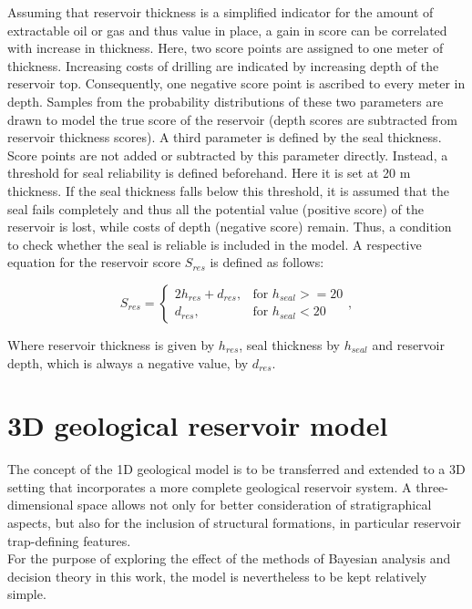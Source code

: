 	        Assuming that reservoir thickness is a simplified indicator for the amount of extractable oil or gas and thus value in place, a gain in score can be correlated with increase in thickness. Here, two score points are assigned to one meter of thickness. Increasing costs of drilling are indicated by increasing depth of the reservoir top. Consequently, one negative score point is ascribed to every meter in depth. Samples from the probability distributions of these two parameters are drawn to model the true score of the reservoir (depth scores are subtracted from reservoir thickness scores).
	        A third parameter is defined by the seal thickness. Score points are not added or subtracted by this parameter directly. Instead, a threshold for seal reliability is defined beforehand. Here it is set at 20 m thickness. If the seal thickness falls below this threshold, it is assumed that the seal fails completely and thus all the potential value (positive score) of the reservoir is lost, while costs of depth (negative score) remain. Thus, a condition to check whether the seal is reliable is included in the model. A respective equation for the reservoir score $S_{res}$ is defined as follows:
			
			\begin{equation}\label{eq:1D_score_system}
			S_{res} = 
			\begin{cases}
			2h_{res} + d_{res}, & \text{for } h_{seal} >= 20  \\
			d_{res}, & \text{for } h_{seal} < 20
			\end{cases},
			\end{equation}
			
			Where reservoir thickness is given by $h_{res}$, seal thickness by $h_{seal}$ and reservoir depth, which is always a negative value, by $d_{res}$.
		
		\section{3D geological reservoir model}
		The concept of the 1D geological model is to be transferred and extended to a 3D setting that incorporates a more complete geological reservoir system. A three-dimensional space allows not only for better consideration of stratigraphical aspects, but also for the inclusion of structural formations, in particular reservoir trap-defining features.\\
		For the purpose of exploring the effect of the methods of Bayesian analysis and decision theory in this work, the model is nevertheless to be kept relatively simple. 
		
